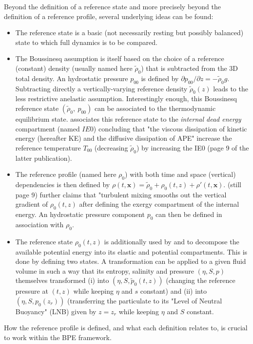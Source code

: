 Beyond the definition of a reference state and more precisely beyond the definition of a reference profile, several underlying ideas can be found:
\begin{itemize}
\setlength\itemsep{0pt}
	\item The reference state is a basic (not necessarily resting but possibly balanced) state to which full dynamics is to be compared.
	\item The Boussinesq assumption is itself based on the choice of a reference (constant) density (usually named here $\tilde{\rho}_{0}$) that is subtracted from the 3D total density. An hydrostatic pressure $p_{00}$ is defined by $\partial p_{00}/ \partial z=-\tilde{\rho}_{0} g$. Subtracting directly a vertically-varying reference density $\tilde{\rho}_{0}(z)$ leads to the less restrictive anelastic assumption. Interestingly enough, this Boussinesq reference state $(\tilde{\rho}_{0},\ p_{00})$ can be associated to the thermodynamic equilibrium state. \cite{tailleux_energetics_2009,tailleux_thermodynamicsdynamics_2012} associates this reference state to the \textit{internal dead energy} compartment (named $IE0$) concluding that "the viscous dissipation of kinetic energy (hereafter KE) and the diffusive dissipation of APE" increase the reference temperature $T_{00}$ (decreasing $\tilde{\rho}_{0}$) by increasing the IE0 (page 9 of the latter publication).
	\item The reference profile (named here $\rho_0$) with both time and space (vertical) dependencies is then defined by $\rho(t,\mathbf{x})=\tilde{\rho}_{0}+\rho_0(t,z)+\rho'(t,\mathbf{x})$.  \cite{tailleux_thermodynamicsdynamics_2012} (still page 9) further claims that "turbulent mixing smooths out the vertical gradient of $\rho_0(t,z)$ after defining the exergy compartment of the internal energy. An hydrostatic pressure component $p_0$ can then be defined in association with $\rho_0$.
	\item The reference state $\rho_0(t,z)$ is additionally used by \citet{andrews_note_1981} and \citet{tailleux_local_2018} to decompose the available potential energy into its elastic and potential compartments. This is done by defining two states. A transformation can be applied to a given fluid volume in such a way that its entropy, salinity and pressure $(\eta,S,p)$ themselves transformed (i) into $(\eta,S,\tilde{p}_0(t,z))$ (changing the reference pressure at $(t,z)$ while keeping $\eta$ and $s$ constant) and (ii) into $(\eta,S,p_0(z_r))$ (transferring the particulate to its "Level of Neutral Buoyancy" (LNB) given by $z=z_r$ while keeping $\eta$ and $S$ constant. 
\end{itemize}
How the reference profile is defined, and what each definition relates to, is crucial to work within the BPE framework. 


